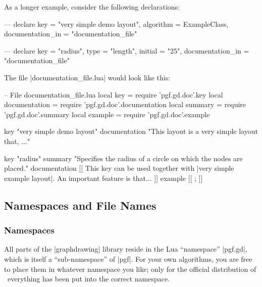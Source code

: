 
As a longer example, consider the following declarations:
%
\begin{codeexample}[code only, tikz syntax=false]
---
declare {
  key               = "very simple demo layout",
  algorithm         = ExampleClass,
  documentation_in  = "documentation_file"
}

---
declare {
  key               = "radius",
  type              = "length",
  initial           = "25",
  documentation_in  = "documentation_file"
}
\end{codeexample}

The file |documentation_file.lua| would look like this:
%
\begin{codeexample}[code only, tikz syntax=false]
-- File documentation_file.lua
local key           = require 'pgf.gd.doc'.key
local documentation = require 'pgf.gd.doc'.documentation
local summary       = require 'pgf.gd.doc'.summary
local example       = require 'pgf.gd.doc'.example

key           "very simple demo layout"
documentation "This layout is a very simple layout that, ..."

key           "radius"
summary       "Specifies the radius of a circle on which the nodes are placed."
documentation
[[
This key can be used together with |very simple example layout|. An
important feature is that...
]]
example
[[
\tikz {};
]]
\end{codeexample}


\subsection{Namespaces and File Names}
\label{section-gd-namespaces}

\subsubsection{Namespaces}

All parts of the |graphdrawing| library reside in the Lua ``namespace''
|pgf.gd|, which is itself a ``sub-namespace'' of |pgf|. For your own
algorithms, you are free to place them in whatever namespace you like; only for
the official distribution of \pgfname\ everything has been put into the correct
namespace.

